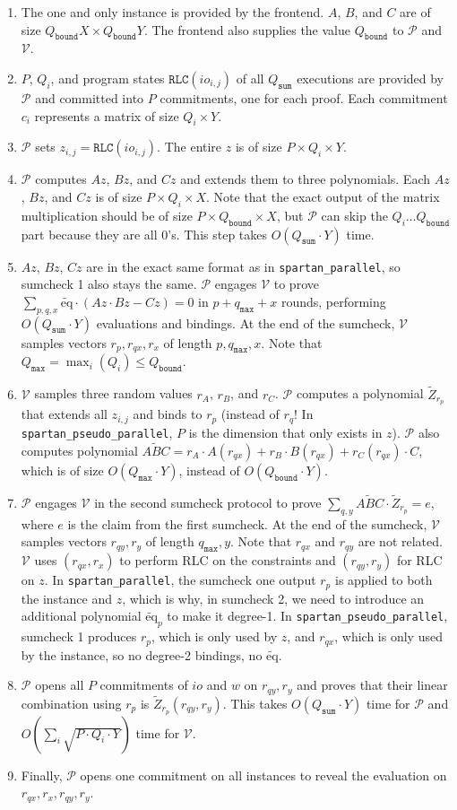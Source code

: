 \documentclass{article}
\newcommand{\red}[1] {\color{red}#1\color{black}}
\newcommand{\code}{\texttt}
\newcommand{\Qbound}{Q_{\mathtt{bound}}}
\newcommand{\Qsum}{Q_{\mathtt{sum}}}
\newcommand{\Qmax}{Q_{\mathtt{max}}}
\newcommand{\qmax}{q_{\mathtt{max}}}
\renewcommand{\P}{\mathcal{P}}
\newcommand{\V}{\mathcal{V}}
\newcommand{\RLC}{\mathtt{RLC}}
\newcommand{\Z}{\widetilde{Z}}
\newcommand{\ABC}{\widetilde{ABC}}
\newcommand{\eq}{\widetilde{\mbox{eq}}}
\begin{document}
\begin{enumerate}
    \item The one and only instance is provided by the frontend. $A$, $B$, and $C$ are of size $\Qbound X\times \Qbound Y$. The frontend also supplies the value $\Qbound$ to $\P$ and $\V$.
    \item $P$, $Q_i$, and program states $\RLC(io_{i, j})$ of all $\Qsum$ executions are provided by $\P$ and committed into $P$ commitments, one for each proof. Each commitment $c_i$ represents a matrix of size $Q_i \times Y$.
    \item $\P$ sets $z_{i, j} = \RLC(io_{i, j})$. The entire $z$ is of size $P\times Q_i\times Y$.
    \item $\P$ computes $Az$, $Bz$, and $Cz$ and extends them to three polynomials. Each $Az$, $Bz$, and $Cz$ is of size $P\times Q_i \times X$. Note that the exact output of the matrix multiplication should be of size $P\times \Qbound \times X$, but $\P$ can skip the $Q_i \dots \Qbound$ part because they are all 0's. This step takes $O(\Qsum\cdot Y)$ time.
    \item $Az$, $Bz$, $Cz$ are in the exact same format as in \code{spartan\_parallel}, so sumcheck 1 also stays the same. $\P$ engages $\V$ to prove $\sum_{p, q, x} \eq\cdot (Az \cdot Bz - Cz) = 0$ in $p + \qmax + x$ rounds, performing $O(\Qsum\cdot Y)$ evaluations and bindings. At the end of the sumcheck, $\V$ samples vectors $r_p, r_{qx}, r_x$ of length $p, \qmax, x$. Note that $\Qmax = \max_i(Q_i)\leq\Qbound$.
    \item $\V$ samples three random values $r_A$, $r_B$, and $r_C$. $\P$ computes a polynomial $\Z_{r_p}$ that extends all $z_{i, j}$ and binds to $r_p$ (instead of $r_q$! In \code{spartan\_pseudo\_parallel}, $P$ is the dimension that only exists in $z$). $\P$ also computes polynomial $\ABC = r_A\cdot A(r_{qx}) + r_B\cdot B(r_{qx}) + r_C(r_{qx})\cdot C$, which is of size $O(\Qmax \cdot Y)$, instead of $O(\Qbound \cdot Y)$.
    \item $\P$ engages $\V$ in the second sumcheck protocol to prove $\sum_{q, y} \ABC \cdot \Z_{r_p} = e$, where $e$ is the claim from the first sumcheck. At the end of the sumcheck, $\V$ samples vectors $r_{qy}, r_y$ of length $\qmax, y$. Note that $r_{qx}$ and $r_{qy}$ are not related. $\V$ uses $(r_{qx}, r_x)$ to perform RLC on the constraints and $(r_{qy}, r_y)$ for RLC on $z$. \red{In \code{spartan\_parallel}, the sumcheck one output $r_p$ is applied to both the instance and $z$, which is why, in sumcheck 2, we need to introduce an additional polynomial $\eq_p$ to make it degree-1. In \code{spartan\_pseudo\_parallel}, sumcheck 1 produces $r_p$, which is only used by $z$, and $r_{qx}$, which is only used by the instance, so no degree-2 bindings, no $\eq$.}
    \item $\P$ opens all $P$ commitments of $io$ and $w$ on $r_{qy}, r_y$ and proves that their linear combination using $r_p$ is $\Z_{r_p}(r_{qy}, r_y)$. This takes $O(\Qsum\cdot Y)$ time for $\P$ and $O(\sum_i\sqrt{P\cdot Q_i\cdot Y})$ time for $\V$.
    \item Finally, $\P$ opens one commitment on all instances to reveal the evaluation on $r_{qx}, r_x, r_{qy}, r_y$.
\end{enumerate}
\end{document}
